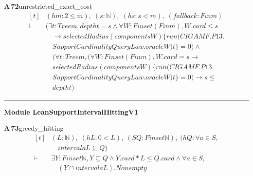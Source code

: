 \documentclass[conference]{IEEEtran}
\theoremstyle{definition}
\newcommand{\lean}[1]{\textsf{\footnotesize #1}}
\begin{document}
\noindent\textbf{A\,72}\quad\lean{unrestricted\_exact\_cost}
{\footnotesize\[ \begin{aligned}[t]
&(\mathit{hm} : 2 \leq \mathit{m}),\; (\mathit{s} : \mathbb{N} ),\; (\mathit{hs} : \mathit{s} < \mathit{m}),\; (\mathit{fallback} : \mathit{Fin} \mathit{m})\\
\vdash\;&(\exists \mathit{t} : \mathit{Tree} \mathit{m}, \mathit{depth} \mathit{t} = \mathit{s} \wedge \forall \mathit{W} : \mathit{Finset} (\mathit{Fin} \mathit{m}), \mathit{W}.\mathit{card} \leq \mathit{s}\\
&\quad \to \mathit{selectedRadius} (\mathit{components} \mathit{W}) \{ \mathit{run} (\mathit{CIGAMF}.\mathit{P13}.\\
&\quad \mathit{SupportCardinalityQueryLaw}.\mathit{oracle} \mathit{W}) \mathit{t}\} = 0) \wedge\\
&\quad (\forall \mathit{t} : \mathit{Tree} \mathit{m}, (\forall \mathit{W} : \mathit{Finset} (\mathit{Fin} \mathit{m}), \mathit{W}.\mathit{card} = \mathit{s} \to\\
&\quad \mathit{selectedRadius} (\mathit{components} \mathit{W}) \{ \mathit{run} (\mathit{CIGAMF}.\mathit{P13}.\\
&\quad \mathit{SupportCardinalityQueryLaw}.\mathit{oracle} \mathit{W}) \mathit{t}\} = 0) \to \mathit{s} \leq\\
&\quad \mathit{depth} \mathit{t})
\end{aligned} \]}

\vspace{4pt}\noindent\rule{\columnwidth}{0.4pt}\par\vspace{2pt}
\noindent\textbf{Module \lean{LeanSupportIntervalHittingV1}}\par\vspace{3pt}

\noindent\textbf{A\,73}\quad\lean{greedy\_hitting}
{\footnotesize\[ \begin{aligned}[t]
&(\mathit{L} : \mathbb{N} ),\; (\mathit{hL} : 0 < \mathit{L}),\; (\mathit{S} \mathit{Q} : \mathit{Finset} \mathbb{N} ),\; (\mathit{hQ} : \forall \mathit{a} \in \mathit{S},\\
&\quad \mathit{interval} \mathit{a} \mathit{L} \subseteq \mathit{Q})\\
\vdash\;&\exists \mathit{Y} : \mathit{Finset} \mathbb{N} ,\mathit{Y} \subseteq \mathit{Q} \wedge \mathit{Y}.\mathit{card}*\mathit{L} \leq \mathit{Q}.\mathit{card} \wedge \forall \mathit{a} \in \mathit{S},\\
&\quad (\mathit{Y} \cap \mathit{interval} \mathit{a} \mathit{L}).\mathit{Nonempty}
\end{aligned} \]}
\end{document}
